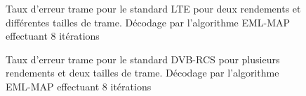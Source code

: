 % 			
% 			
																																																																																																																																										
% 			
% 			
																																																																																																																																								
% 			
% 			

\begin{figure}[h]
	\begin{center}
		\subfloat[LTE R=1/3]{
			
			\label{sub:lte13}
		}	   

		\subfloat[LTE R=4/5]{
			
			\label{sub:lte45}
		}
																																																																																																																																									
		\caption{Taux d'erreur trame pour le standard LTE pour deux rendements et différentes tailles de trame. Décodage 
		par l'algorithme EML-MAP effectuant 8 itérations}
		\label{fig:ferstdlte}
	\end{center}
\end{figure}

\begin{figure}[h]
	\begin{center}
		\subfloat[DVB-RCS - K=220]{
			
			\label{sub:dvbrcs220}
		}	   

		\subfloat[DVB-RCS - K=752]{
			
			\label{sub:dvbrcs752}
		}
																																																																																																																																									
		\caption{Taux d'erreur trame pour le standard DVB-RCS pour plusieurs rendements et deux tailles de trame. 
		Décodage par l'algorithme EML-MAP effectuant 8 itérations}
		\label{fig:ferstdDVB1}
	\end{center}
\end{figure}


